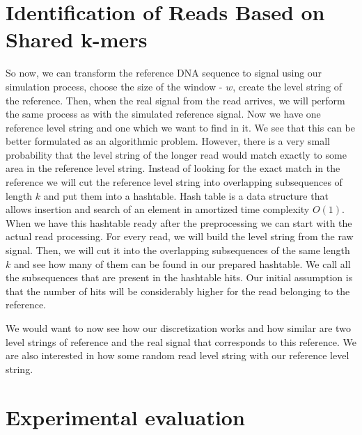 \section{Identification of Reads Based on Shared k-mers}

So now, we can transform the reference DNA sequence to signal using our simulation
process, choose the size of the window - $w$, create the level string of the reference.
Then, when the real signal from the read arrives, we will perform the same process
as with the simulated reference signal. Now we have one reference level string and
one which we want to find in it. We see that this can be better formulated as an
algorithmic problem. However, there is a very small probability that the level string
of the longer read would match exactly to some area in the reference level string.
Instead of looking for the exact match in the reference we will cut the reference
level string into overlapping subsequences of length $k$ and put them into a hashtable.
Hash table is a data structure that allows insertion and search of an element in
amortized time complexity $O(1)$. When we have this hashtable ready after the
preprocessing we can start with the actual read processing. For every read, we will
build the level string from the raw signal. Then, we will cut it into the overlapping
subsequences of the same length $k$ and see how many of them can be found in our
prepared hashtable. We call all the subsequences that are present in the hashtable
hits. Our initial assumption is that the number of hits will be considerably higher
for the read belonging to the reference.

We would want to now see how our discretization works and how similar are two level
strings of reference and the real signal that corresponds to this reference. We are
also interested in how some random read level string with our reference level string.

\section{Experimental evaluation}
